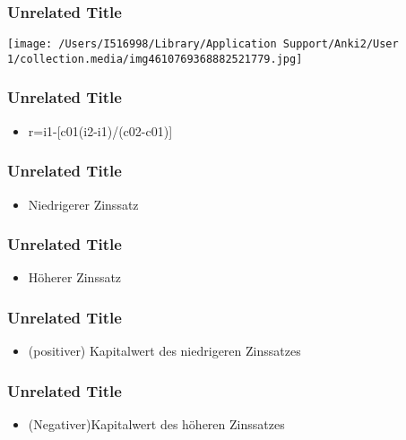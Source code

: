 \documentclass[aspectratio=3218]{beamer}
\begin{document}
\begin{frame}
\frametitle<presentation>{Unrelated Title}

\begin{center}
\texttt{[image: /Users/I516998/Library/Application Support/Anki2/User 1/collection.media/img4610769368882521779.jpg]}
\end{center}


\note[item]{}
\end{frame}
\begin{frame}
\frametitle<presentation>{Unrelated Title}


\begin{itemize}
\item r=i1-[c01(i2-i1)/(c02-c01)]
\end{itemize}

\note[item]{}
\end{frame}
\begin{frame}
\frametitle<presentation>{Unrelated Title}


\begin{itemize}
\item Niedrigerer Zinssatz
\end{itemize}

\note[item]{}
\end{frame}
\begin{frame}
\frametitle<presentation>{Unrelated Title}


\begin{itemize}
\item Höherer Zinssatz 
\end{itemize}

\note[item]{}
\end{frame}
\begin{frame}
\frametitle<presentation>{Unrelated Title}


\begin{itemize}
\item (positiver) Kapitalwert des niedrigeren Zinssatzes
\end{itemize}

\note[item]{}
\end{frame}
\begin{frame}
\frametitle<presentation>{Unrelated Title}


\begin{itemize}
\item (Negativer)Kapitalwert des höheren Zinssatzes
\end{itemize}

\note[item]{}
\end{frame}
\end{document}
